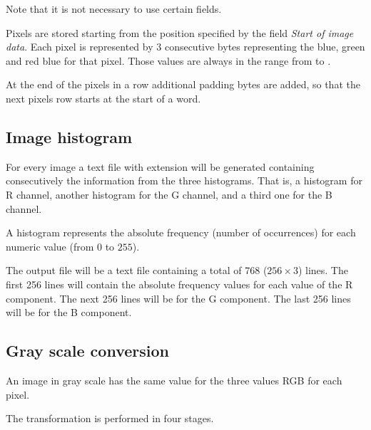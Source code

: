 Note that it is not necessary to use certain fields.

Pixels are stored starting from the position specified by the field
\emph{Start of image data}.
Each pixel is represented by 3 consecutive bytes representing the
blue, green and red blue for that pixel.
Those values are always in the range from  to .

At the end of the pixels in a row additional padding bytes are added,
so that the next pixels row starts at the start of a word.

\subsection{Image histogram}

For every image a text file  with extension  will be generated
containing consecutively the information from the three histograms.
That is, a histogram for R channel, another histogram for the G channel,
and a third one for the B channel.

A histogram represents the absolute frequency (number of occurrences)
for each numeric value (from $0$ to $255$).

The output file will be a text file containing a total of 768 ($256 \times 3$) lines.
The first 256 lines will contain the absolute frequency values for each value of the R component.
The next 256 lines will be for the G component.
The last 256 lines will be for the B component.

\subsection{Gray scale conversion}

An image in gray scale has the same value for the three values RGB for each pixel.

The transformation is performed in four stages.

